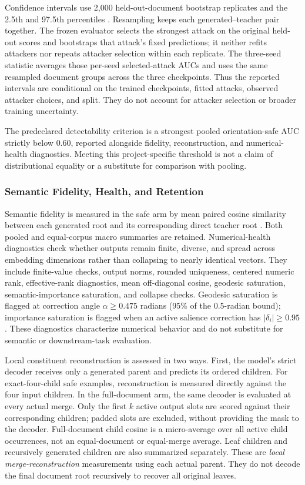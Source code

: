 \documentclass[10pt]{article}
\begin{document}
Confidence intervals use 2,000 held-out-document bootstrap replicates and the
2.5th and 97.5th percentiles \citep{efron-tibshirani-1993-bootstrap}. Resampling
keeps each generated--teacher pair together. The frozen evaluator selects the
strongest attack on the original held-out scores and bootstraps that attack's
fixed predictions; it neither refits attackers nor repeats attacker selection
within each replicate. The three-seed statistic averages those per-seed
selected-attack AUCs and uses the same resampled document groups across the
three checkpoints. Thus the reported intervals are conditional on the trained
checkpoints, fitted attacks, observed attacker choices, and split. They do not
account for attacker selection or broader training uncertainty.

The predeclared detectability criterion is a strongest pooled orientation-safe
AUC strictly below \(0.60\), reported alongside fidelity, reconstruction, and
numerical-health diagnostics. Meeting this project-specific threshold is not
a claim of distributional equality or a substitute for comparison with pooling.

\subsubsection{Semantic Fidelity, Health, and Retention}
\label{sec:retention-protocol}

Semantic fidelity is measured in the safe arm by mean paired cosine similarity
between each generated root and its corresponding direct teacher root \citep{reimers-gurevych-2019-sentence}. Both
pooled and equal-corpus macro summaries are retained. Numerical-health
diagnostics check whether outputs remain finite, diverse, and spread across
embedding dimensions rather than collapsing to nearly identical vectors. They
include finite-value checks, output norms, rounded uniqueness, centered numeric
rank, effective-rank diagnostics, mean off-diagonal cosine, geodesic saturation,
semantic-importance saturation, and collapse checks.
Geodesic saturation is flagged at correction angle \(\alpha\geq0.475\)
radians (95\% of the 0.5-radian bound); importance saturation is flagged when
an active salience correction has \(\lvert\delta_i\rvert\geq0.95\).
These diagnostics characterize numerical behavior and do not substitute for
semantic or downstream-task evaluation.

Local constituent reconstruction is assessed in two ways. First, the model's strict
decoder receives only a generated parent and predicts its ordered children.
For exact-four-child safe examples, reconstruction is measured directly against
the four input children. In the full-document arm, the same decoder is evaluated
at every actual merge. Only the first \(k\) active output slots are scored
against their corresponding children; padded slots are excluded, without
providing the mask to the decoder. Full-document child cosine is a micro-average over
all active child occurrences, not an equal-document or equal-merge average.
Leaf children and recursively generated children are also summarized separately.
These are \emph{local merge-reconstruction} measurements using each actual
parent. They do not decode the final document root recursively to recover all
original leaves.
\end{document}
